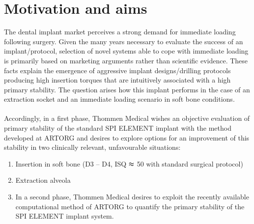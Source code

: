 \documentclass[12pt, a4paper, twoside]{report}
\begin{document}
\section{Motivation and aims}
%
The dental implant market perceives a strong demand for immediate loading following surgery.
Given the many years necessary to evaluate the success of an implant/protocol, selection of novel systems able to cope with immediate loading is primarily based on marketing arguments rather than scientific evidence.
These facts explain the emergence of aggressive implant designs/drilling protocols producing high insertion torques that are intuitively associated with a high primary stability.
The question arises how this implant performs in the case of an extraction socket and an immediate loading scenario in soft bone conditions.\\
\\
Accordingly, in a first phase, Thommen Medical wishes an objective evaluation of primary stability of the standard SPI ELEMENT implant with the method developed at ARTORG and desires to explore options for an improvement of this stability in two clinically relevant, unfavourable situations:
%
\begin{enumerate}
\item Insertion in soft bone (D3 – D4, ISQ $\thickapprox$ 50 with standard surgical protocol)
\item Extraction alveola
\item In a second phase, Thommen Medical desires to exploit the recently available computational method of ARTORG to quantify the primary stability of the SPI ELEMENT implant system.
\end{enumerate}
%
%
%
%
\newpage
%
%
\end{document}
